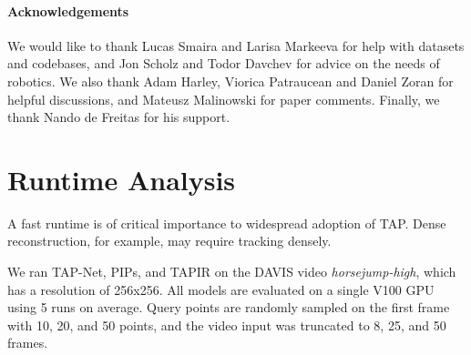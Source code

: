 \documentclass[10pt,twocolumn,letterpaper]{article}
\begin{document}
\paragraph{Acknowledgements} We would like to thank Lucas Smaira and Larisa Markeeva for help with datasets and codebases, and Jon Scholz and Todor Davchev for advice on the needs of robotics.  We also thank Adam Harley, Viorica Patraucean and Daniel Zoran for helpful discussions, and Mateusz Malinowski for paper comments.  Finally, we thank Nando de Freitas for his support.

{\small


}

\appendix

\section{Runtime Analysis}
\label{sec:runtime}


\begin{table}[t]
\caption{\textbf{Computational time for model inference.} We conducted a comparison of computational time (in seconds) for model inference on the DAVIS video \textit{horsejump-high} with 256x256 resolution.}
\label{tab:computational_time}
\end{table}

A fast runtime is of critical importance to widespread adoption of TAP.  Dense reconstruction, for example, may require tracking densely.  

We ran TAP-Net, PIPs, and TAPIR on the DAVIS video \textit{horsejump-high}, which has a resolution of 256x256. All models are evaluated on a single V100 GPU using 5 runs on average. Query points are randomly sampled on the first frame with 10, 20, and 50 points, and the video input was truncated to 8, 25, and 50 frames. 
\end{document}
